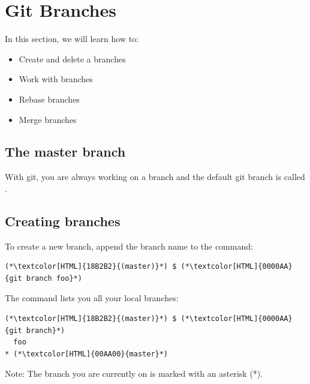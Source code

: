 \section{Git Branches}
\begin{frame}[fragile]
  \slidetitle

  In this section, we will learn how to:
  \begin{itemize}
    \item Create and delete a branches
    \item Work with branches
    \item Rebase branches
    \item Merge branches
  \end{itemize}
\end{frame}

\subsection{The master branch}
\begin{frame}[fragile]
  \subslidetitle

  With git, you are always working on a branch and the default git branch is called .

\end{frame}

\subsection{Creating branches}
\begin{frame}[fragile]
  \subslidetitle

  To create a new  branch, append the branch name to the  command:
  \begin{lstlisting}
(*\textcolor[HTML]{18B2B2}{(master)}*) $ (*\textcolor[HTML]{0000AA}{git branch foo}*)
\end{lstlisting}

  The  command lists you all your local branches:
  \begin{lstlisting}
(*\textcolor[HTML]{18B2B2}{(master)}*) $ (*\textcolor[HTML]{0000AA}{git branch}*)
  foo
* (*\textcolor[HTML]{00AA00}{master}*)
\end{lstlisting}

Note: The branch you are currently on is marked with an asterisk (*).
\end{frame}

